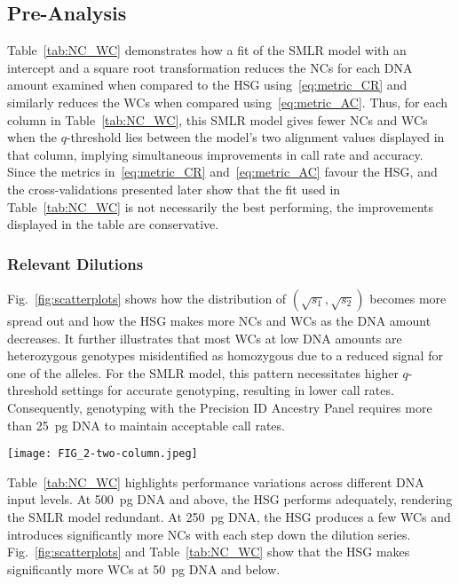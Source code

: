 \documentclass[preprint,5p,times,11pt]{elsarticle}
\begin{document}
\subsection{Pre-Analysis}
Table~\ref{tab:NC_WC} demonstrates how a fit of the SMLR model with an intercept and a square root transformation reduces the NCs for each DNA amount examined when compared to the HSG using~\eqref{eq:metric_CR} and similarly reduces the WCs when compared using~\eqref{eq:metric_AC}.
Thus, for each column in Table~\ref{tab:NC_WC}, this SMLR model gives fewer NCs and WCs when the $q$-threshold lies between the model’s two alignment values displayed in that column, implying simultaneous improvements in call rate and accuracy.
Since the metrics in~\eqref{eq:metric_CR} and~\eqref{eq:metric_AC} favour the HSG, and the cross-validations presented later show that the fit used in Table~\ref{tab:NC_WC} is not necessarily the best performing, the improvements displayed in the table are conservative.



\subsubsection{Relevant Dilutions}
Fig.~\ref{fig:scatterplots} shows how the distribution of $(\sqrt{s_1}, \sqrt{s_2})$ becomes more spread out and how the HSG makes more NCs and WCs as the DNA amount decreases.
It further illustrates that most WCs at low DNA amounts are heterozygous genotypes misidentified as homozygous due to a reduced signal for one of the alleles.
For the SMLR model, this pattern necessitates higher $q$-threshold settings for accurate genotyping, resulting in lower call rates.
Consequently, genotyping with the Precision ID Ancestry Panel requires more than \SI{25}{\pg} DNA to maintain acceptable call rates.
\begin{figure*}
\centering
\texttt{[image: FIG\_2-two-column.jpeg]}
\caption{
Distribution of square-root transformed allele signals.\\
A dot represents a set of read counts $(s_1, s_2)$ for an SNP and is coloured according to the true genotype: red for heterozygous and blue or yellow for homozygous genotypes.
The displayed DNA quantities indicate where the accuracy of the HID SNP Genotyper Plugin falls below 100\%, with its wrong calls marked by red crosses and no-calls by black pluses.
}
\label{fig:scatterplots}
\end{figure*}

Table~\ref{tab:NC_WC} highlights performance variations across different DNA input levels.
At \SI{500}{\pg} DNA and above, the HSG performs adequately, rendering the SMLR model redundant.
At \SI{250}{\pg} DNA, the HSG produces a few WCs and introduces significantly more NCs with each step down the dilution series.
Fig.~\ref{fig:scatterplots} and Table~\ref{tab:NC_WC} show that the HSG makes significantly more WCs at \SI{50}{\pg} DNA and below.
\end{document}
